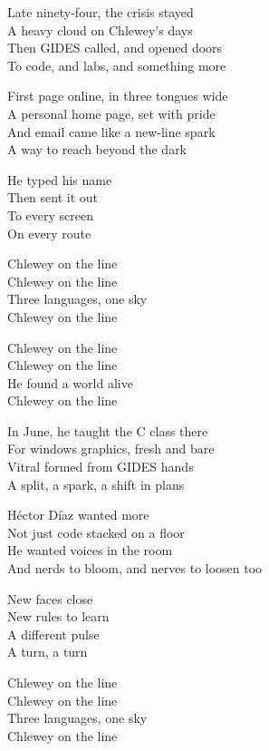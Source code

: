 \begin{lyrics}
Late ninety-four, the crisis stayed\\
A heavy cloud on Chlewey’s days\\
Then GIDES called, and opened doors\\
To code, and labs, and something more

First page online, in three tongues wide\\
A personal home page, set with pride\\
And email came like a new-line spark\\
A way to reach beyond the dark

He typed his name\\
Then sent it out\\
To every screen\\
On every route

Chlewey on the line\\
Chlewey on the line\\
Three languages, one sky\\
Chlewey on the line

Chlewey on the line\\
Chlewey on the line\\
He found a world alive\\
Chlewey on the line

In June, he taught the C class there\\
For windows graphics, fresh and bare\\
Vitral formed from GIDES hands\\
A split, a spark, a shift in plans

Héctor Díaz wanted more\\
Not just code stacked on a floor\\
He wanted voices in the room\\
And nerds to bloom, and nerves to loosen too

New faces close\\
New rules to learn\\
A different pulse\\
A turn, a turn

Chlewey on the line\\
Chlewey on the line\\
Three languages, one sky\\
Chlewey on the line


\end{lyrics}
